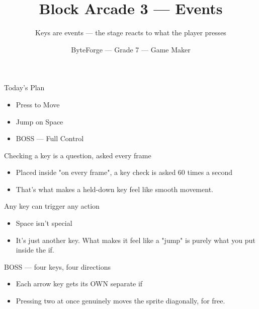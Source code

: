 \documentclass[aspectratio=169]{beamer}
\title{Block Arcade 3 — Events}
\subtitle{Keys are events — the stage reacts to what the player presses}
\author{ByteForge --- Grade 7 --- Game Maker}
\date{}
\begin{document}
\begin{frame}
    \titlepage
\end{frame}

\begin{frame}{Today's Plan}
    \begin{itemize}
        \item Press to Move
        \item Jump on Space
        \item[$\bigstar$] BOSS --- Full Control
    \end{itemize}
\end{frame}

\begin{frame}{Checking a key is a question, asked every frame}
    \large
    \begin{itemize}
        \item Placed inside "on every frame", a key check is asked 60 times a second
        \item That's what makes a held-down key feel like smooth movement.
    \end{itemize}
\end{frame}


\begin{frame}{Any key can trigger any action}
    \large
    \begin{itemize}
        \item Space isn't special
        \item It's just another key. What makes it feel like a "jump" is purely what you put inside the if.
    \end{itemize}
\end{frame}


\begin{frame}{BOSS — four keys, four directions}
    \large
    \begin{itemize}
        \item Each arrow key gets its OWN separate if
        \item Pressing two at once genuinely moves the sprite diagonally, for free.
    \end{itemize}

    \begin{center}
    \end{center}
\end{frame}
\end{document}
